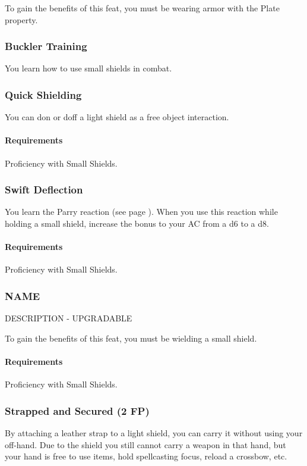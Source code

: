     To gain the benefits of this feat, you must be wearing armor with the Plate property.

\subsubsection{Buckler Training} \label{feat::bucklertraining}
    You learn how to use small shields in combat.
\subsubsection{Quick Shielding} \label{feat::quickshielding}
    You can don or doff a light shield as a free object interaction.
    \paragraph{Requirements} Proficiency with Small Shields.
\subsubsection{Swift Deflection} \label{feat::swiftdeflection}
    You learn the Parry reaction (see page \pageref{act::parry}).
    When you use this reaction while holding a small shield, increase the bonus to your AC from a d6 to a d8.
    \paragraph{Requirements} Proficiency with Small Shields.
\subsubsection{NAME} \label{feat::name}
    DESCRIPTION - UPGRADABLE

    To gain the benefits of this feat, you must be wielding a small shield.
    \paragraph{Requirements} Proficiency with Small Shields.
\subsubsection{Strapped and Secured (2 FP)} \label{feat::strappedandsecured}
    By attaching a leather strap to a light shield, you can carry it without using your off-hand.
    Due to the shield you still cannot carry a weapon in that hand, but your hand is free to use items, hold spellcasting focus, reload a crossbow, etc.

